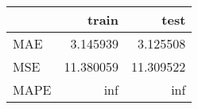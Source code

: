 \begin{tabular}{lrr}
\toprule
{} &      train &       test \\
\midrule
MAE  &   3.145939 &   3.125508 \\
MSE  &  11.380059 &  11.309522 \\
MAPE &        inf &        inf \\
\bottomrule
\end{tabular}
